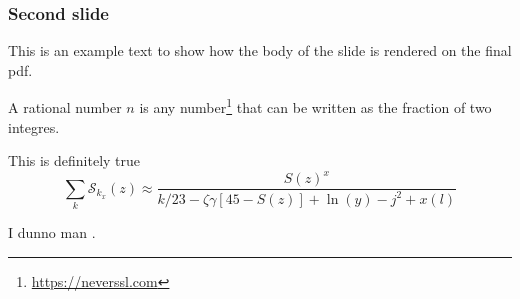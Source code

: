 \documentclass[./main.tex]{subfiles}
\begin{document}
\begin{frame}[label=slide02]
        \frametitle{Second slide}

        This is an example text to show how the body of the slide is rendered on the final pdf.
        \begin{definition}
                A rational number $n$ is any number\footnote{\url{https://neverssl.com}} that can be written as the fraction of two integres.
        \end{definition} \pause
        \begin{theorem}
        This is definitely true \cite{kramers40}
        \begin{equation*}
                \sum_k\mathcal{S}_{k_x}(z) \approx \frac{S(z)^x}{k / 23 -\zeta\gamma [45- S(z)] + \ln(y) - j^2+x(l)}
        \end{equation*}
        \end{theorem} \pause
        \begin{example}
             I dunno man \cite{kuehn11}.
        \end{example}
\end{frame}
\end{document}
